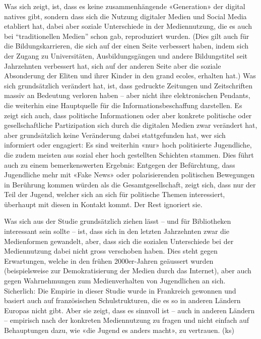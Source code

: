 \documentclass[a4paper,
fontsize=11pt,
oneside,
numbers=noperiodatend,
parskip=half-,
bibliography=totoc,
final
]{scrartcl}
\begin{document}
Was sich zeigt, ist, dass es keine zusammenhängende «Generation» der
digital natives gibt, sondern dass sich die Nutzung digitaler Medien und
Social Media etabliert hat, dabei aber soziale Unterschiede in der
Mediennutzung, die es auch bei \enquote{traditionellen Medien} schon
gab, reproduziert wurden. (Dies gilt auch für die Bildungskarrieren, die
sich auf der einen Seite verbessert haben, indem sich der Zugang zu
Universitäten, Ausbildungsgängen und andere Bildungstitel seit
Jahrzehnten verbessert hat, sich auf der anderen Seite aber die soziale
Absonderung der Eliten und ihrer Kinder in den grand ecoles, erhalten
hat.) Was sich grundsätzlich verändert hat, ist, dass gedruckte
Zeitungen und Zeitschriften massiv an Bedeutung verloren haben -- aber
nicht ihre elektronischen Pendants, die weiterhin eine Hauptquelle für
die Informationsbeschaffung darstellen. Es zeigt sich auch, dass
politische Informationen oder aber konkrete politische oder
gesellschaftliche Partizipation sich durch die digitalen Medien zwar
verändert hat, aber grundsätzlich keine Veränderung dabei stattgefunden
hat, wer sich informiert oder engagiert: Es sind weiterhin «nur» hoch
politisierte Jugendliche, die zudem meisten aus sozial eher hoch
gestellten Schichten stammen. Dies führt auch zu einem bemerkenswerten
Ergebnis: Entgegen der Befürchtung, dass Jugendliche mehr mit «Fake
News» oder polarisierenden politischen Bewegungen in Berührung kommen
würden als die Gesamtgesellschaft, zeigt sich, dass nur der Teil der
Jugend, welcher sich an sich für politische Themen interessiert,
überhaupt mit diesen in Kontakt kommt. Der Rest ignoriert sie.

Was sich aus der Studie grundsätzlich ziehen lässt -- und für
Bibliotheken interessant sein sollte -- ist, dass sich in den letzten
Jahrzehnten zwar die Medienformen gewandelt, aber, dass sich die
sozialen Unterschiede bei der Mediennutzung dabei nicht gross verschoben
haben. Dies steht gegen Erwartungen, welche in den frühen 2000er-Jahren
geäussert wurden (beispielsweise zur Demokratisierung der Medien durch
das Internet), aber auch gegen Wahrnehmungen zum Medienverhalten von
Jugendlichen an sich. Sicherlich: Die Empirie in dieser Studie wurde in
Frankreich gewonnen und basiert auch auf französischen Schulstrukturen,
die es so in anderen Ländern Europas nicht gibt. Aber sie zeigt, dass es
sinnvoll ist -- auch in anderen Ländern -- empirisch nach der konkreten
Mediennutzung zu fragen und nicht einfach auf Behauptungen dazu, wie
«die Jugend es anders macht», zu vertrauen. (ks)
\end{document}
